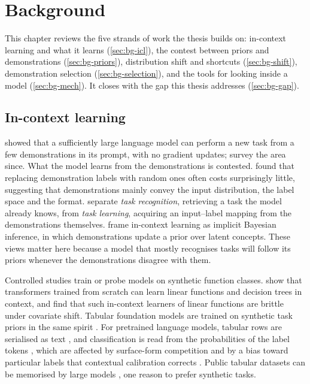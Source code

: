 \chapter{Background}
\label{ch:background}

This chapter reviews the five strands of work the thesis builds on: in-context learning and what it learns (\autoref{sec:bg-icl}), the contest between priors and demonstrations (\autoref{sec:bg-priors}), distribution shift and shortcuts (\autoref{sec:bg-shift}), demonstration selection (\autoref{sec:bg-selection}), and the tools for looking inside a model (\autoref{sec:bg-mech}).
It closes with the gap this thesis addresses (\autoref{sec:bg-gap}).

\section{In-context learning}
\label{sec:bg-icl}

\citet{brown2020language} showed that a sufficiently large language model can perform a new task from a few demonstrations in its prompt, with no gradient updates; \citet{dong2024survey} survey the area since.
What the model learns from the demonstrations is contested.
\citet{min2022rethinking} found that replacing demonstration labels with random ones often costs surprisingly little, suggesting that demonstrations mainly convey the input distribution, the label space and the format.
\citet{pan2023what} separate \emph{task recognition}, retrieving a task the model already knows, from \emph{task learning}, acquiring an input--label mapping from the demonstrations themselves.
\citet{xie2022explanation} frame in-context learning as implicit Bayesian inference, in which demonstrations update a prior over latent concepts.
These views matter here because a model that mostly recognises tasks will follow its priors whenever the demonstrations disagree with them.

Controlled studies train or probe models on synthetic function classes.
\citet{garg2022what} show that transformers trained from scratch can learn linear functions and decision trees in context, and \citet{zhang2024trained} find that such in-context learners of linear functions are brittle under covariate shift.
Tabular foundation models are trained on synthetic task priors in the same spirit \citep{muller2022transformers,hollmann2023tabpfn,hollmann2025accurate}.
For pretrained language models, tabular rows are serialised as text \citep{hegselmann2023tabllm,dinh2022lift}, and classification is read from the probabilities of the label tokens \citep{brown2020language}, which are affected by surface-form competition \citep{holtzman2021surface} and by a bias toward particular labels that contextual calibration corrects \citep{zhao2021calibrate}.
Public tabular datasets can be memorised by large models \citep{bordt2024elephants}, one reason to prefer synthetic tasks.

